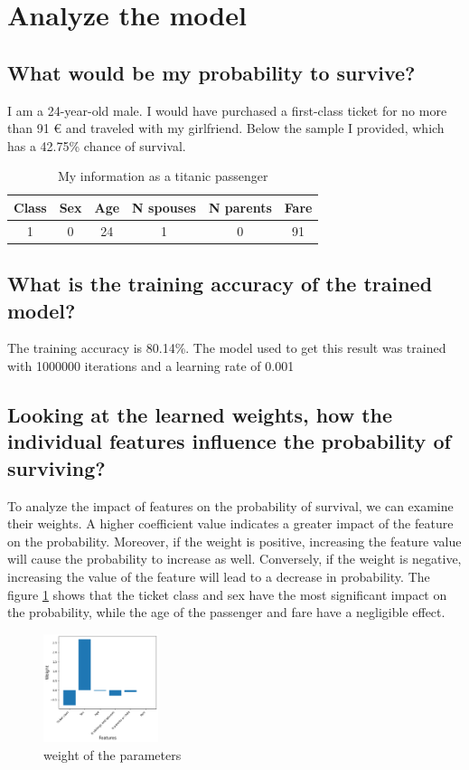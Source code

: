 \documentclass{article}
\begin{document}
\clearpage

\section{Analyze the model}
\subsection{What would be my probability to survive? }
I am a 24-year-old male.
I would have purchased a first-class ticket for no more than 91 € and traveled with my girlfriend.
Below  the sample I provided, which has a 42.75\% chance of survival.

\bgroup
{}
\begin{table}[h]
  \center
  \begin{tabular}{cccccc}
    Class & Sex & Age & N spouses & N parents & Fare \\
    \hline
    1     & 0   & 24  & 1         & 0         & 91   \\
  \end{tabular}
  \label{table:my_data}
  \caption{My information as a titanic passenger}
\end{table}
\egroup
\subsection{What is the training accuracy of the trained model?}
The training accuracy is  80.14\%.
The model used to get this result was trained with 1000000 iterations and a learning rate of 0.001
\subsection{Looking at the learned weights, how the individual features influence the probability of surviving?}
To analyze the impact of features on the probability of survival, we can examine their weights.
A higher coefficient value indicates a greater impact of the feature on the probability.
Moreover, if the weight is positive, increasing the feature value will cause the probability to increase as well.
Conversely, if the weight is negative, increasing the value of the feature will lead to a decrease in probability.
The figure \ref*{fig:parameters} shows that the ticket class and sex have the most significant impact on the probability,
while the age of the passenger and fare have a negligible effect.

\begin{figure}[h]
  \centering
  \includegraphics[width=0.3\textwidth]{images/Parameters.png}
  \caption{weight of the parameters}
  \label{fig:parameters}

\end{figure}
\end{document}
